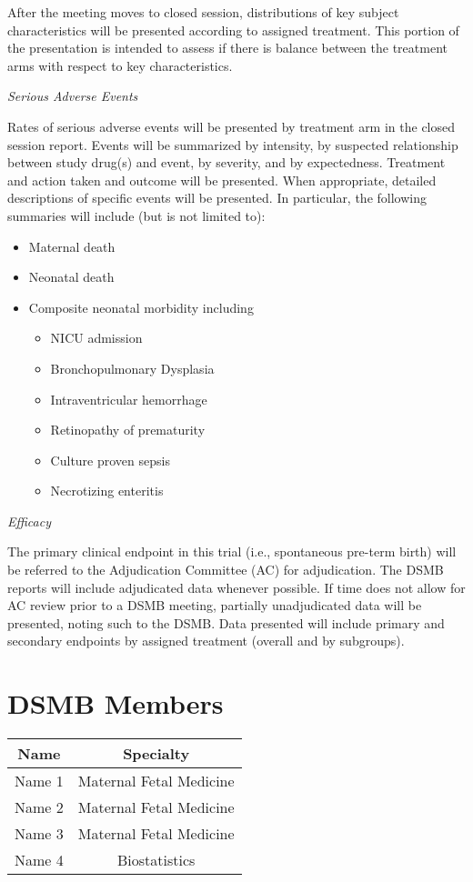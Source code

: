 \documentclass[12pt]{article}
\begin{document}
After the meeting moves to closed session, distributions of key subject 
characteristics will be presented according to assigned treatment. This 
portion of the presentation is intended to assess if there is balance 
between the treatment arms with respect to key characteristics.

\vspace{0.4cm}
\noindent \textit{Serious Adverse Events}

Rates of serious adverse events will be presented by treatment arm in the 
closed session report. Events will be summarized by intensity, by suspected 
relationship between study drug(s) and event, by severity, and by 
expectedness. Treatment and action taken and outcome will be presented. When 
appropriate, detailed descriptions of specific events will be presented.  In 
particular, the following summaries will include (but is not limited to):
\begin{itemize}
\item Maternal death
\item Neonatal death
\item Composite neonatal morbidity including
\begin{itemize}
\item NICU admission
\item Bronchopulmonary Dysplasia
\item Intraventricular hemorrhage
\item Retinopathy of prematurity
\item Culture proven sepsis
\item Necrotizing enteritis
\end{itemize}
\end{itemize}

\vspace{0.4cm}
\noindent \textit{Efficacy}

The primary clinical endpoint in this trial (i.e., spontaneous pre-term 
birth) will be referred to the Adjudication Committee (AC) for adjudication. 
The DSMB reports will include adjudicated data whenever possible. If time 
does not allow for AC review prior to a DSMB meeting, partially 
unadjudicated data will be presented, noting such to the DSMB.  Data 
presented will include primary and secondary endpoints by assigned treatment 
(overall and by subgroups). 

\section{DSMB Members}
\begin{tabular}{cc}

Name & Specialty \\ \hline
Name 1 & Maternal Fetal Medicine \\
Name 2 & Maternal Fetal Medicine \\
Name 3 & Maternal Fetal Medicine \\
Name 4 & Biostatistics \\ \hline
\end{tabular}
\end{document}
